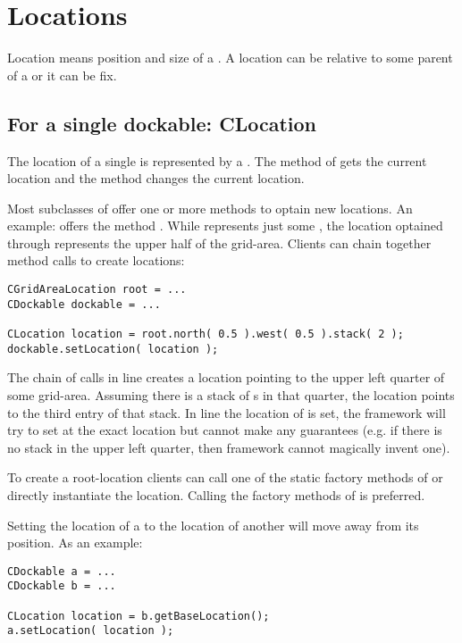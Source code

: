 \section{Locations} \label{sec:location}
Location means position and size of a . A location can be relative to some parent of a  or it can be fix.

\subsection{For a single dockable: CLocation}
The location of a single  is represented by a . The method  of  gets the current location and the method \linebreak {} changes the current location.

Most subclasses of  offer one or more methods to optain new locations. An example:  offers the method . While  represents just some , the location optained through  represents the upper half of the grid-area. Clients can chain together method calls to create locations:
\begin{lstlisting}
CGridAreaLocation root = ...
CDockable dockable = ...
		
CLocation location = root.north( 0.5 ).west( 0.5 ).stack( 2 );
dockable.setLocation( location );
\end{lstlisting}
The chain of calls in line  creates a location pointing to the upper left quarter of some grid-area. Assuming there is a stack of s in that quarter, the location points to the third entry of that stack. In line  the location of  is set, the framework will try to set  at the exact location but cannot make any guarantees (e.g. if there is no stack in the upper left quarter, then framework cannot magically invent one).

To create a root-location clients can call one of the static factory methods of  or directly instantiate the location. Calling the factory methods of  is preferred.

Setting the location of a   to the location of another   will move away  from its position. As an example:
\begin{lstlisting}
CDockable a = ...
CDockable b = ...

CLocation location = b.getBaseLocation();
a.setLocation( location );
\end{lstlisting}

